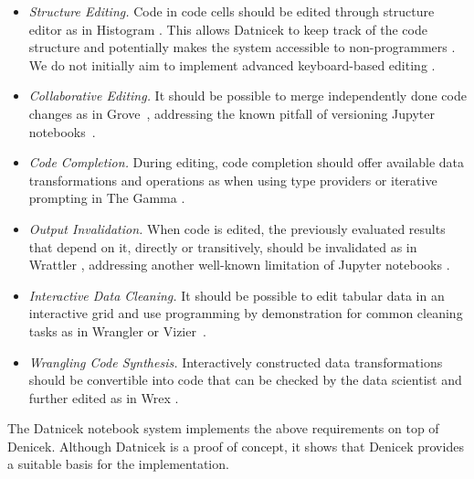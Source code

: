 \documentclass[sigconf]{acmart}
\begin{document}
\begin{itemize}
\item \emph{Structure Editing.} Code in code cells should be edited through structure editor
  as in Histogram \cite{petricek-2019-histogram}. This allows Datnicek to keep track of the code
  structure and potentially makes the system accessible to non-programmers \cite{mcnutt-2023-projectional}.
  We do not initially aim to implement advanced keyboard-based editing \cite{moon-2022-tylr,beckman-2023-sandblocks}.

\item \emph{Collaborative Editing.} It should be possible to merge independently done code changes
  as in Grove~\cite{adams-2025-grove}, addressing the known pitfall of versioning Jupyter
  notebooks~\cite{singer-2020-jollity}.

\item \emph{Code Completion.} During editing, code completion should offer available data
  transformations and operations as when using type providers \cite{syme-2013-inforich} or
  iterative prompting in The Gamma \cite{petricek-2022-thegamma}.

\item \emph{Output Invalidation.} When code is edited, the previously evaluated results that
  depend on it, directly or transitively, should be invalidated as in Wrattler \cite{petricek-2018-wrattler,petricek-2020-live},
  addressing another well-known limitation of Jupyter notebooks \cite{koop-2017-dataflow}.

\item \emph{Interactive Data Cleaning.} It should be possible to edit tabular data in an interactive
  grid and use programming by demonstration for common cleaning tasks as in
  Wrangler or Vizier~\cite{kandel-2011-wrangler,kennedy-2022-vizier}.

\item \emph{Wrangling Code Synthesis.} Interactively constructed data transformations should be
  convertible into code that can be checked by the data scientist and further edited as in Wrex \cite{drossos-2020-wrex}.
\end{itemize}

\noindent
The Datnicek notebook system implements the above requirements on top of Denicek.
Although Datnicek is a proof of concept, it shows that Denicek provides a suitable basis
for the implementation.

\end{document}
